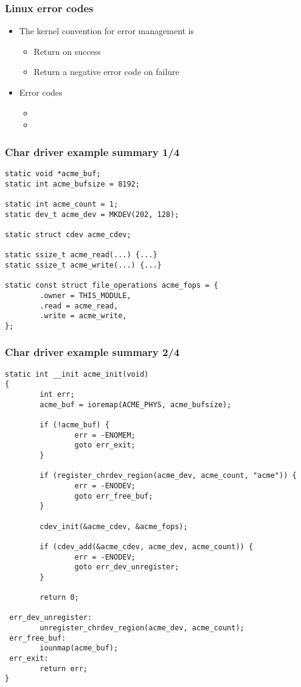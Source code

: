 \begin{frame}
  \frametitle{Linux error codes}
  \begin{itemize}
  \item The kernel convention for error management is
    \begin{itemize}
    \item Return  on success
    \item Return a negative error code on failure
    \end{itemize}
  \item Error codes
    \begin{itemize}
    \item {}
    \item {}
    \end{itemize}
  \end{itemize}
\end{frame}

\begin{frame}[fragile]
  \frametitle{Char driver example summary 1/4}
\begin{verbatim}
static void *acme_buf;
static int acme_bufsize = 8192;

static int acme_count = 1;
static dev_t acme_dev = MKDEV(202, 128);

static struct cdev acme_cdev;

static ssize_t acme_read(...) {...}
static ssize_t acme_write(...) {...}

static const struct file_operations acme_fops = {
        .owner = THIS_MODULE,
        .read = acme_read,
        .write = acme_write,
};
\end{verbatim}
\end{frame}

\begin{frame}[fragile]
  \frametitle{Char driver example summary 2/4}
\begin{verbatim}
static int __init acme_init(void)
{
        int err;
        acme_buf = ioremap(ACME_PHYS, acme_bufsize);

        if (!acme_buf) {
                err = -ENOMEM;
                goto err_exit;
        }

        if (register_chrdev_region(acme_dev, acme_count, "acme")) {
                err = -ENODEV;
                goto err_free_buf;
        }

        cdev_init(&acme_cdev, &acme_fops);

        if (cdev_add(&acme_cdev, acme_dev, acme_count)) {
                err = -ENODEV;
                goto err_dev_unregister;
        }

        return 0;

 err_dev_unregister:
        unregister_chrdev_region(acme_dev, acme_count);
 err_free_buf:
        iounmap(acme_buf);
 err_exit:
        return err;
}
\end{verbatim}
\end{frame}

